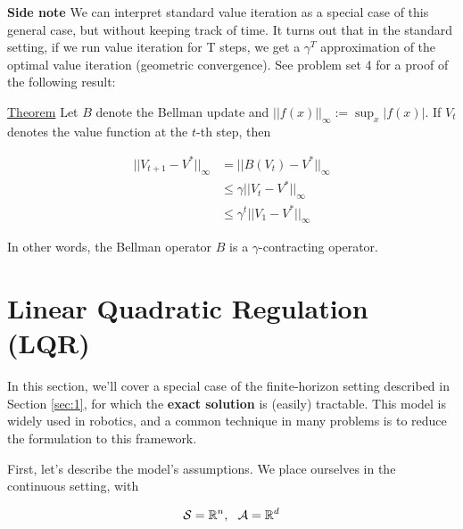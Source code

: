 \documentclass{article}
\begin{document}
\textbf{Side note} We can interpret standard value iteration as a special case of this general case, but without keeping track of time. It turns out that in the standard setting, if we run value iteration for T steps, we get a $ \gamma^T $ approximation of the optimal value iteration (geometric convergence). See problem set 4 for a proof of the following result:



\vspace{0.5cm}

\underline{Theorem} Let $ B $ denote the Bellman update and $ || f(x) ||_{\infty}  := \sup_{x} |f(x)|$. If $ V_t $ denotes the value function at the $ t $-th step, then

\begin{align*}
	|| V_{t+1} - V^* ||_{\infty} &= || B(V_t) - V^* ||_{\infty}\\
	&\leq \gamma || V_t - V^* ||_\infty\\
	&\leq \gamma^{t} || V_1 - V^* ||_\infty
\end{align*}

In other words, the Bellman operator $ B $ is a $ \gamma $-contracting operator.

\section{Linear Quadratic Regulation (LQR)}

In this section, we'll cover a special case of the finite-horizon setting described in Section \ref{sec:1}, for which the \textbf{exact solution} is (easily) tractable. This model is widely used in robotics, and a common technique in many problems is to reduce the formulation to this framework.

First, let's describe the model's assumptions. We place ourselves in the continuous setting, with

\[ \mathcal{S} = \mathbb{R}^n, \ \ \mathcal{A} = \mathbb{R}^\di \]
\end{document}
